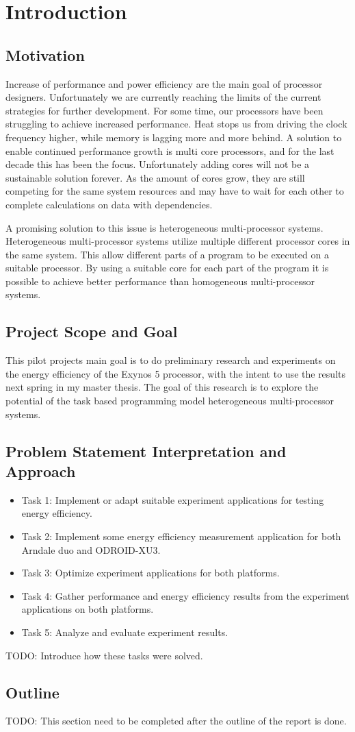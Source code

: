 \chapter[Introduction]{Introduction}
\section{Motivation}
Increase of performance and power efficiency are the main goal of processor designers.
Unfortunately we are currently reaching the limits of the current strategies for further development.
For some time, our processors have been struggling to achieve increased performance.
Heat stops us from driving the clock frequency higher, while memory is lagging more and more behind.
A solution to enable continued performance growth is multi core processors, and for the last decade this has been the focus.
Unfortunately adding cores will not be a sustainable solution forever.
As the amount of cores grow, they are still competing for the same system resources and may have to wait for each other to complete calculations on data with dependencies.

A promising solution to this issue is heterogeneous multi-processor systems.
Heterogeneous multi-processor systems utilize multiple different processor cores in the same system.
This allow different parts of a program to be executed on a suitable processor.
By using a suitable core for each part of the program it is possible to achieve better performance than homogeneous multi-processor systems.

\section{Project Scope and Goal}
This pilot projects main goal is to do preliminary research and experiments on the energy efficiency of the Exynos 5 processor, with the intent to use the results next spring in my master thesis.
The goal of this research is to explore the potential of the task based programming model heterogeneous multi-processor systems.

\section{Problem Statement Interpretation and Approach}
\begin{itemize}
  \item Task 1: Implement or adapt suitable experiment applications for testing energy efficiency.
  \item Task 2: Implement some energy efficiency measurement application for both Arndale duo and ODROID-XU3.
  \item Task 3: Optimize experiment applications for both platforms.
  \item Task 4: Gather performance and energy efficiency results from the experiment applications on both platforms.
  \item Task 5: Analyze and evaluate experiment results.
\end{itemize}

TODO: Introduce how these tasks were solved.

\section{Outline}
TODO: This section need to be completed after the outline of the report is done.
